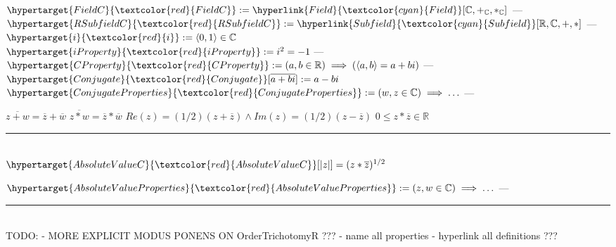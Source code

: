 \documentclass{book}
\newcommand{\df}[1]{\hypertarget{#1}{\textcolor{red}{#1}}}
\newcommand{\rf}[1]{\hyperlink{#1}{\textcolor{cyan}{#1}}}
\newcommand{\abr}{:=}
\begin{document}
$\df{FieldC} \abr \rf{Field}[\mathbb{C}, +_{\mathbb{C}}, *_{\mathbb{C}}]$    \phantom{TODO}--- \\
$\df{RSubfieldC} \abr \rf{Subfield}[\mathbb{R}, \mathbb{C}, +, *]$    \phantom{TODO}--- \\

$\df{i} \abr \langle 0, 1 \rangle \in \mathbb{C}$ \\

$\df{iProperty} \abr i^2 = -1$    \phantom{TODO}--- \\
$\df{CProperty} \abr (a, b \in \mathbb{R}) \implies (\langle a, b \rangle = a + b i)$    \phantom{TODO}--- \\

$\df{Conjugate}[\overline{a + b i}] \abr a - b i$ \\

$\df{ConjugateProperties} \abr (w, z \in \mathbb{C}) \implies \ldots$    \phantom{TODO}--- \\
\begin{enumerate}
  \lit $\overline{z + w} = \overline{z} + \overline{w}$
  \lit $\overline{z * w} = \overline{z} * \overline{w}$
  \lit $Re(z) = (1 / 2) (z + \overline{z}) \land Im(z) = (1 / 2) (z - \overline{z})$
  \lit $0 \leq z * \overline{z} \in \mathbb{R}$
\end{enumerate} \vspace{.75mm} \hrule \vspace{.75mm} \ \\

$\df{AbsoluteValueC}[|z|] = (z * \overline{z})^{1 / 2}$

$\df{AbsoluteValueProperties} \abr (z, w \in \mathbb{C}) \implies \ldots$    \phantom{TODO}--- \\
\begin{enumerate}
\end{enumerate} \vspace{.75mm} \hrule \vspace{.75mm} \ \\

TODO:
- MORE EXPLICIT MODUS PONENS ON OrderTrichotomyR ???
- name all properties
- hyperlink all definitions ???
\end{document}
